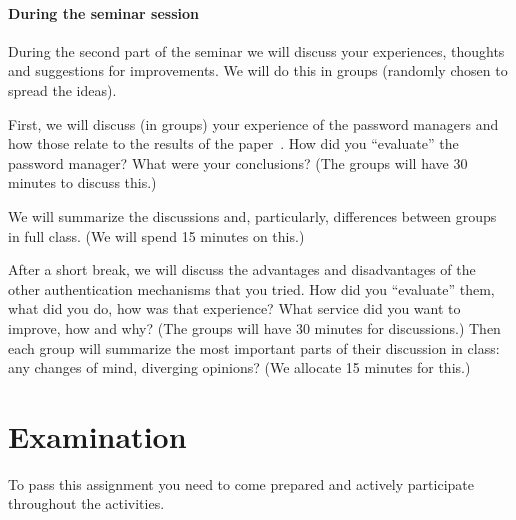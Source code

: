 \paragraph{During the seminar session}

During the second part of the seminar we will discuss your experiences, 
thoughts and suggestions for improvements.
We will do this in groups (randomly chosen to spread the ideas).

First, we will discuss (in groups) your experience of the password managers and 
how those relate to the results of the 
paper~\cite{UsabilityEvaluationOfPasswordManagers}.
How did you \enquote{evaluate} the password manager?
What were your conclusions?
(The groups will have 30 minutes to discuss this.)

We will summarize the discussions and, particularly, differences between groups 
in full class.
(We will spend 15 minutes on this.)

After a short break, we will discuss the advantages and disadvantages of the 
other authentication mechanisms that you tried.
How did you \enquote{evaluate} them, what did you do, how was that experience?
What service did you want to improve, how and why?
(The groups will have 30 minutes for discussions.)
Then each group will summarize the most important parts of their discussion in 
class: any changes of mind, diverging opinions?
(We allocate 15 minutes for this.)


\section{Examination}%
\label{sec:exam}

To pass this assignment you need to come prepared and actively participate 
throughout the activities.


\printbibliography


\appendix

